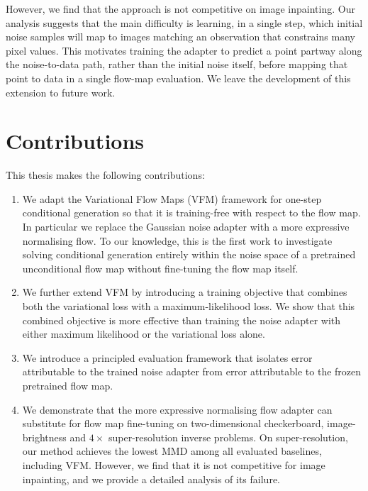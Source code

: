 \documentclass[12pt,a4paper]{report}
\begin{document}
However, we find that the approach is not competitive on image inpainting. Our analysis suggests that the main difficulty is learning, in a single step, which initial noise samples will map to images matching an observation that constrains many pixel values. This motivates training the adapter to predict a point partway along the noise-to-data path, rather than the initial noise itself, before mapping that point to data in a single flow-map evaluation. We leave the development of this extension to future work.

\section{Contributions}
\label{sec:contributions}

This thesis makes the following contributions:

\begin{enumerate}

\item We adapt the Variational Flow Maps (VFM) framework for one-step conditional generation so that it is training-free with respect to the flow map. In particular we replace the Gaussian noise adapter with a more expressive normalising flow. To our knowledge, this is the first work to investigate solving conditional generation entirely within the noise space of a pretrained unconditional flow map without fine-tuning the flow map itself.

\item We further extend VFM by introducing a training objective that combines both the variational loss with a maximum-likelihood loss. We show that this combined objective is more effective than training the noise adapter with either maximum likelihood or the variational loss alone.

\item We introduce a principled evaluation framework that isolates error attributable to the trained noise adapter from error attributable to the frozen pretrained flow map.

\item We demonstrate that the more expressive normalising flow adapter can substitute for flow map fine-tuning on two-dimensional checkerboard, image-brightness and \(4\times\) super-resolution inverse problems. On super-resolution, our method achieves the lowest MMD among all evaluated baselines, including VFM. However, we find that it is not competitive for image inpainting, and we provide a detailed analysis of its failure. 

\end{enumerate}
\end{document}
